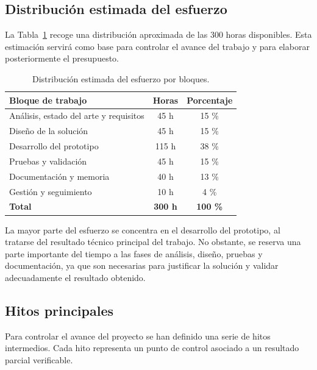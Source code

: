 \subsection{Distribución estimada del esfuerzo}

La Tabla~\ref{tab:distribucion-esfuerzo} recoge una distribución aproximada de las 300 horas disponibles. Esta estimación servirá como base para controlar el avance del trabajo y para elaborar posteriormente el presupuesto.

\begin{table}[h!]
\centering
\small
\begin{tabular}{|p{6cm}|c|c|}
\hline
\textbf{Bloque de trabajo} & \textbf{Horas} & \textbf{Porcentaje} \\ \hline
Análisis, estado del arte y requisitos & 45 h & 15 \% \\ \hline
Diseño de la solución                  & 45 h & 15 \% \\ \hline
Desarrollo del prototipo               & 115 h & 38 \% \\ \hline
Pruebas y validación                   & 45 h & 15 \% \\ \hline
Documentación y memoria                & 40 h & 13 \% \\ \hline
Gestión y seguimiento                  & 10 h & 4 \% \\ \hline
\textbf{Total}                         & \textbf{300 h} & \textbf{100 \%} \\ \hline
\end{tabular}
\caption{Distribución estimada del esfuerzo por bloques.}
\label{tab:distribucion-esfuerzo}
\end{table}

La mayor parte del esfuerzo se concentra en el desarrollo del prototipo, al tratarse del resultado técnico principal del trabajo. No obstante, se reserva una parte importante del tiempo a las fases de análisis, diseño, pruebas y documentación, ya que son necesarias para justificar la solución y validar adecuadamente el resultado obtenido.

\subsection{Hitos principales}

Para controlar el avance del proyecto se han definido una serie de hitos intermedios. Cada hito representa un punto de control asociado a un resultado parcial verificable.

